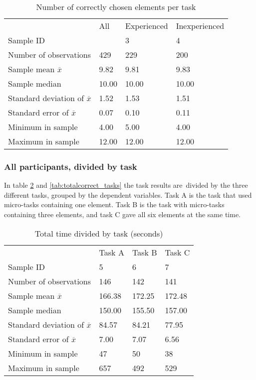 \begin{table}[H]
	\centering
	\begin{tabular}{l|l|l|l}
		 & All  & Experienced & Inexperienced \\ 
		Sample ID &   & 3  & 4   \\ \hline
		Number of observations & 429    & 229  & 200   \\
		Sample mean $\overline{x}$   & 9.82 & 9.81  & 9.83  \\
		Sample median & 10.00 & 10.00 & 10.00 \\
		Standard deviation of $\overline{x}$   & 1.52  & 1.53  &  1.51 \\
		Standard error of $\overline{x}$   & 0.07  & 0.10 &  0.11 \\
		Minimum in sample & 4.00 & 5.00  &  4.00  \\
		Maximum in sample  & 12.00 & 12.00  & 12.00  \\ \hline
	\end{tabular}
	\caption[Correct elements, all participants]{Number of correctly chosen elements per task}
	\label{tab:totalcorrect_all}
\end{table}

\subsubsection{All participants, divided by task}\label{sec:taskdivided_all}

In table \ref{tab:totaltime_tasks} and \ref{tab:totalcorrect_tasks} the task results are\ divided by the three different tasks, grouped by the dependent variables. Task A is the task that used micro-tasks containing one element. Task B is the task with micro-tasks containing three elements, and task C gave all six elements at the same time. 

\begin{table}[H]
	\centering
	\begin{tabular}{l|l|l|l}
		 & Task A & Task B & Task C \\ 		
		Sample ID & 5  & 6  & 7    \\ \hline
		Number of observations & 146    & 142      & 141     \\
		Sample mean $\overline{x}$  & 166.38  &  172.25   &   172.48  \\
		Sample median & 150.00  &  155.50  & 157.00  \\
		Standard deviation of $\overline{x}$   & 84.57  & 84.21  & 77.95   \\
		Standard error of $\overline{x}$   & 7.00 & 7.07 & 6.56 \\
		Minimum in sample    & 47  & 50 &   38   \\
		Maximum in sample   & 657 & 492  & 529 \\ \hline
	\end{tabular}
	\caption[Total time, divided by task]{Total time divided by task (seconds)}
	\label{tab:totaltime_tasks}
\end{table}

